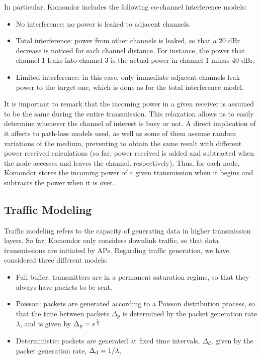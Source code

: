 \documentclass[a4paper]{article}
\begin{document}
		In particular, Komondor includes the following co-channel interference models:		
		\begin{itemize}
			\item No interference: no power is leaked to adjacent channels.
			\item Total interference: power from other channels is leaked, so that a 20 dBr decrease is noticed for each channel distance. For instance, the power that channel 1 leaks into channel 3 is the actual power in channel 1 minus 40 dBr. 
			\item Limited interference: in this case, only immediate adjacent channels leak power to the target one, which is done as for the total interference model.
		\end{itemize}
				
		It is important to remark that the incoming power in a given receiver is assumed to be the same during the entire transmission. This relaxation allows us to easily determine whenever the channel of interest is busy or not. A direct implication of it affects to path-loss models used, as well as some of them assume random variations of the medium, preventing to obtain the same result with different power received calculations (so far, power received is added and subtracted when the node accesses and leaves the channel, respectively). Thus, for each node, Komondor stores the incoming power of a given transmission when it begins and subtracts the power when it is over. 
	
	\subsection{Traffic Modeling}
	\label{section:traffic_modelling}
	Traffic modeling refers to the capacity of generating data in higher transmission layers. So far, Komondor only considers downlink traffic, so that data transmissions are initiated by APs. Regarding traffic generation, we have considered three different models:
	\begin{itemize}
		\item Full buffer: transmitters are in a permanent saturation regime, so that they always have packets to be sent.
		\item Poisson: packets are generated according to a Poisson distribution process, so that the time between packets $\Delta_p$ is determined by the packet generation rate $\lambda$, and is given by $\Delta_{\rm p} = e^{\frac{1}{\lambda}}$
		\item Deterministic: packets are generated at fixed time intervals, $\Delta_d$, given by the packet generation rate, $\Delta_{\rm d} = 1/\lambda$.
	\end{itemize}
\end{document}
